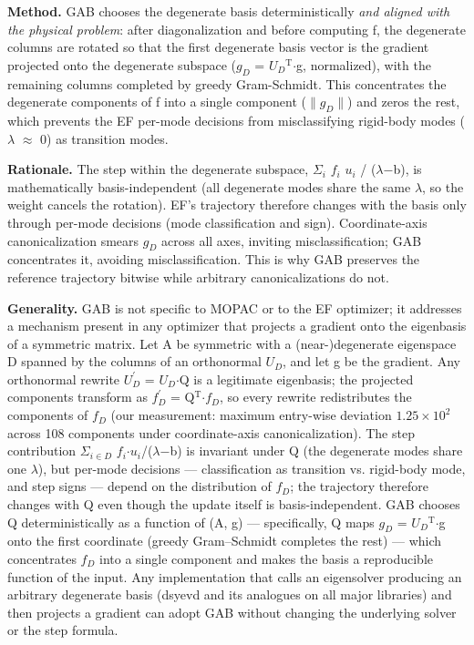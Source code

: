 \documentclass[preprint,12pt]{elsarticle}
\begin{document}
\textbf{Method.} GAB chooses the degenerate basis deterministically \textit{and aligned with the physical problem}: after diagonalization and before computing f, the degenerate columns are rotated so that the first degenerate basis vector is the gradient projected onto the degenerate subspace ($g_D$ = $U_D$$^\mathrm{T}$$\cdot$g, normalized), with the remaining columns completed by greedy Gram-Schmidt. This concentrates the degenerate components of f into a single component ($\|$$g_D$$\|$) and zeros the rest, which prevents the EF per-mode decisions from misclassifying rigid-body modes ($\lambda$ $\approx$ 0) as transition modes.

\textbf{Rationale.} The step within the degenerate subspace, $\Sigma_i$ $f_i$ $u_i$ / ($\lambda$$-$b), is mathematically basis-independent (all degenerate modes share the same $\lambda$, so the weight cancels the rotation). EF's trajectory therefore changes with the basis only through per-mode decisions (mode classification and sign). Coordinate-axis canonicalization smears $g_D$ across all axes, inviting misclassification; GAB concentrates it, avoiding misclassification. This is why GAB preserves the reference trajectory bitwise while arbitrary canonicalizations do not.

\textbf{Generality.} GAB is not specific to MOPAC or to the EF optimizer; it addresses a mechanism present in any optimizer that projects a gradient onto the eigenbasis of a symmetric matrix. Let A be symmetric with a (near-)degenerate eigenspace D spanned by the columns of an orthonormal $U_D$, and let g be the gradient. Any orthonormal rewrite $U_D^{\prime}$ = $U_D$$\cdot$Q is a legitimate eigenbasis; the projected components transform as $f_D^{\prime}$ = Q$^\mathrm{T}$$\cdot$$f_D$, so every rewrite redistributes the components of $f_D$ (our measurement: maximum entry-wise deviation $1.25\times 10^{2}$ across 108 components under coordinate-axis canonicalization). The step contribution $\Sigma_{i\in D}$ $f_i$$\cdot$$u_i$/($\lambda$$-$b) is invariant under Q (the degenerate modes share one $\lambda$), but per-mode decisions --- classification as transition vs. rigid-body mode, and step signs --- depend on the distribution of $f_D$; the trajectory therefore changes with Q even though the update itself is basis-independent. GAB chooses Q deterministically as a function of (A, g) --- specifically, Q maps $g_D$ = $U_D$$^\mathrm{T}$$\cdot$g onto the first coordinate (greedy Gram--Schmidt completes the rest) --- which concentrates $f_D$ into a single component and makes the basis a reproducible function of the input. Any implementation that calls an eigensolver producing an arbitrary degenerate basis (dsyevd and its analogues on all major libraries) and then projects a gradient can adopt GAB without changing the underlying solver or the step formula.
\end{document}
